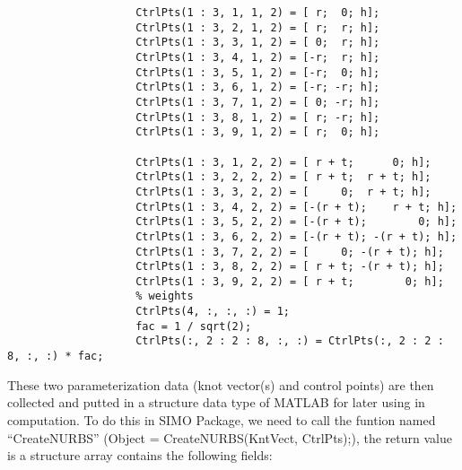 \begin{itemize}
\begin{itemize}
\begin{lstlisting}
                    CtrlPts(1 : 3, 1, 1, 2) = [ r;  0; h];
                    CtrlPts(1 : 3, 2, 1, 2) = [ r;  r; h];
                    CtrlPts(1 : 3, 3, 1, 2) = [ 0;  r; h];
                    CtrlPts(1 : 3, 4, 1, 2) = [-r;  r; h];
                    CtrlPts(1 : 3, 5, 1, 2) = [-r;  0; h];
                    CtrlPts(1 : 3, 6, 1, 2) = [-r; -r; h];
                    CtrlPts(1 : 3, 7, 1, 2) = [ 0; -r; h];
                    CtrlPts(1 : 3, 8, 1, 2) = [ r; -r; h];
                    CtrlPts(1 : 3, 9, 1, 2) = [ r;  0; h];

                    CtrlPts(1 : 3, 1, 2, 2) = [ r + t;      0; h];
                    CtrlPts(1 : 3, 2, 2, 2) = [ r + t;  r + t; h];
                    CtrlPts(1 : 3, 3, 2, 2) = [     0;  r + t; h];
                    CtrlPts(1 : 3, 4, 2, 2) = [-(r + t);    r + t; h];
                    CtrlPts(1 : 3, 5, 2, 2) = [-(r + t);        0; h];
                    CtrlPts(1 : 3, 6, 2, 2) = [-(r + t); -(r + t); h];
                    CtrlPts(1 : 3, 7, 2, 2) = [     0; -(r + t); h];
                    CtrlPts(1 : 3, 8, 2, 2) = [ r + t; -(r + t); h];
                    CtrlPts(1 : 3, 9, 2, 2) = [ r + t;        0; h];
                    % weights
                    CtrlPts(4, :, :, :) = 1;
                    fac = 1 / sqrt(2);
                    CtrlPts(:, 2 : 2 : 8, :, :) = CtrlPts(:, 2 : 2 : 8, :, :) * fac;
                \end{lstlisting}
        \end{itemize}
\end{itemize}
These two parameterization data (knot vector(s) and control points) are then collected and putted in a structure data type of MATLAB for later using in computation. To do this in SIMO Package, we need to call the funtion named ``CreateNURBS'' ({\selectfont \ttfamily Object = CreateNURBS(KntVect, CtrlPts);}), the return value is a structure array contains the following fields:
